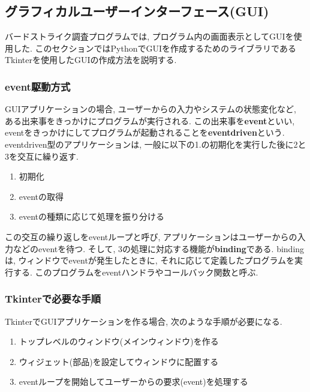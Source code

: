 \documentclass[dvipdfmx]{jsarticle}
\newcommand{\Add}[1]{\textcolor{red}{#1}}
\begin{document}
\subsection{グラフィカルユーザーインターフェース(GUI)}
バードストライク調査プログラムでは, プログラム内の画面表示としてGUIを使用した.
このセクションではPythonでGUIを作成するためのライブラリであるTkinterを使用したGUIの作成方法を説明する.

\subsubsection{event駆動方式}
GUIアプリケーションの場合, ユーザーからの入力やシステムの状態変化など, ある出来事をきっかけにプログラムが実行される.
この出来事を\textbf{event}といい, eventをきっかけにしてプログラムが起動されることを\textbf{eventdriven}という.
eventdriven型のアプリケーションは, 一般に以下の1.の初期化を実行した後に2と3を交互に繰り返す.
\begin{enumerate}
    \item 初期化
    \item eventの取得
    \item eventの種類に応じて処理を振り分ける
\end{enumerate}

この交互の繰り返しをeventループと呼び, アプリケーションはユーザーからの入力などのeventを待つ.
そして, 3の処理に対応する機能が\textbf{binding}である.
bindingは, ウィンドウでeventが発生したときに, それに応じて定義したプログラムを実行する.
このプログラムをeventハンドラやコールバック関数と呼ぶ.

\subsubsection{Tkinterで必要な手順}

TkinterでGUIアプリケーションを作る場合, 次のような手順が必要になる.
\begin{enumerate}
    \item トップレベルのウィンドウ(メインウィンドウ)を作る
    \item ウィジェット(部品)を設定してウィンドウに配置する
    \item eventループを開始してユーザーからの要求(event)を処理する
\end{enumerate}
\end{document}
